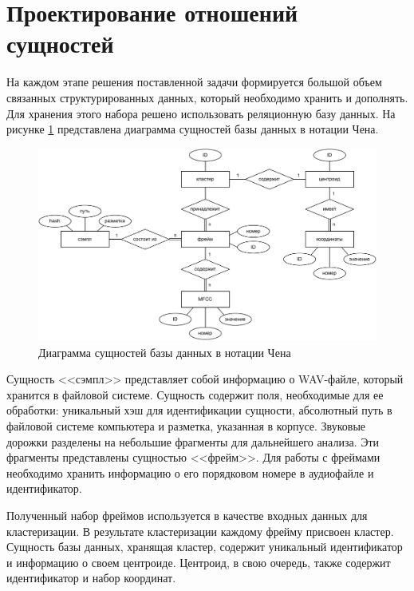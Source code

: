 \section{Проектирование отношений сущностей}
На каждом этапе  решения поставленной задачи формируется большой объем связанных структурированных данных, который необходимо хранить и дополнять. Для хранения этого набора решено использовать реляционную базу данных. На рисунке \ref{fig:chen} представлена диаграмма сущностей базы данных в нотации Чена.
\begin{figure}[H]
	\centering
	\includegraphics[width=0.8\linewidth]{assets/chen}
	\caption{Диаграмма сущностей базы данных в нотации Чена}
	\label{fig:chen}
\end{figure} 
Сущность <<сэмпл>> представляет собой информацию о WAV-файле, который хранится в файловой системе. Сущность содержит поля, необходимые для ее обработки: уникальный хэш для идентификации сущности, абсолютный путь в файловой системе компьютера и разметка, указанная в корпусе. Звуковые дорожки разделены на небольшие фрагменты для дальнейшего анализа. Эти фрагменты представлены сущностью <<фрейм>>. Для работы с фреймами необходимо хранить информацию о его порядковом номере в аудиофайле и идентификатор. 

Полученный набор фреймов используется в качестве входных данных для кластеризации. В результате кластеризации каждому фрейму присвоен кластер. Сущность базы данных, хранящая кластер, содержит уникальный идентификатор и информацию о своем центроиде. Центроид, в свою очередь, также содержит идентификатор и набор координат.